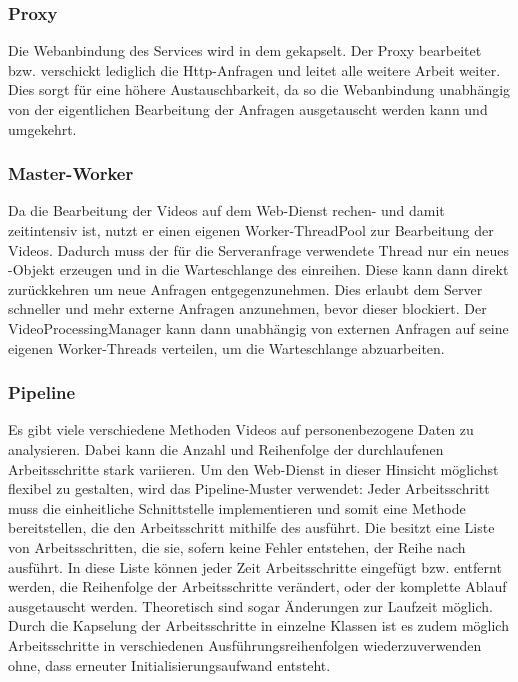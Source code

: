 \subsubsection{Proxy} \label{service:pattern:proxy}
Die Webanbindung des Services wird in dem  gekapselt. Der Proxy bearbeitet bzw. verschickt lediglich die Http-Anfragen und leitet alle weitere Arbeit weiter. Dies sorgt für eine höhere Austauschbarkeit, da so die Webanbindung unabhängig von der eigentlichen Bearbeitung der Anfragen ausgetauscht werden kann und umgekehrt.

\subsubsection{Master-Worker} \label{service:pattern:masterworker}
Da die Bearbeitung der Videos auf dem Web-Dienst rechen- und damit zeitintensiv ist, nutzt er einen eigenen Worker-ThreadPool zur Bearbeitung der Videos. Dadurch muss der für die Serveranfrage verwendete Thread nur ein neues -Objekt erzeugen und in die Warteschlange des  einreihen. Diese kann dann direkt zurückkehren um neue Anfragen entgegenzunehmen. Dies erlaubt dem Server schneller und mehr externe Anfragen anzunehmen, bevor dieser blockiert.\newline
Der VideoProcessingManager kann dann unabhängig von externen Anfragen auf seine eigenen Worker-Threads verteilen, um die Warteschlange abzuarbeiten.

\subsubsection{Pipeline} \label{service:pattern:pipeline}
Es gibt viele verschiedene Methoden Videos auf personenbezogene Daten zu analysieren. Dabei kann die Anzahl und Reihenfolge der durchlaufenen Arbeitsschritte stark variieren. Um den Web-Dienst in dieser Hinsicht möglichst flexibel zu gestalten, wird das Pipeline-Muster verwendet: \newline
Jeder Arbeitsschritt muss die einheitliche Schnittstelle  implementieren und somit eine Methode bereitstellen, die den Arbeitsschritt mithilfe des  ausführt.\newline
Die  besitzt eine Liste von Arbeitsschritten, die sie, sofern keine Fehler entstehen, der Reihe nach ausführt. In diese Liste können jeder Zeit Arbeitsschritte eingefügt bzw. entfernt werden, die Reihenfolge der Arbeitsschritte verändert, oder der komplette Ablauf ausgetauscht werden. Theoretisch sind sogar Änderungen zur Laufzeit möglich.\newline
Durch die Kapselung der Arbeitsschritte in einzelne Klassen ist es zudem möglich Arbeitsschritte in verschiedenen Ausführungsreihenfolgen wiederzuverwenden ohne, dass erneuter Initialisierungsaufwand entsteht.

